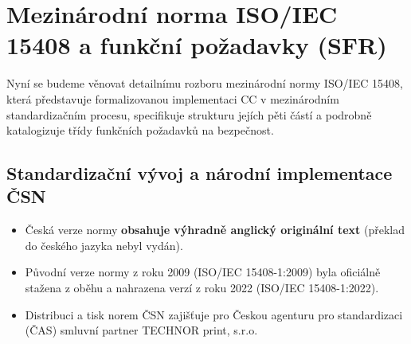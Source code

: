 \documentclass[10pt,a4paper]{article}
\begin{document}
	
	\section{Mezinárodní norma ISO/IEC 15408 a funkční požadavky (SFR)}
	
	Nyní se budeme věnovat detailnímu rozboru mezinárodní normy ISO/IEC 15408, která představuje formalizovanou implementaci CC v mezinárodním standardizačním procesu, specifikuje strukturu jejích pěti částí a podrobně katalogizuje třídy funkčních požadavků na bezpečnost.
	
	\subsection{Standardizační vývoj a národní implementace ČSN}
	
	\begin{itemize}
		\item Česká verze normy \textbf{obsahuje výhradně anglický originální text} (překlad do českého jazyka nebyl vydán).
		\item Původní verze normy z roku 2009 (ISO/IEC 15408-1:2009) byla oficiálně stažena z oběhu a nahrazena verzí z roku 2022 (ISO/IEC 15408-1:2022).
		\item Distribuci a tisk norem ČSN zajišťuje pro Českou agenturu pro standardizaci (ČAS) smluvní partner TECHNOR print, s.r.o.
	\end{itemize}
	
\end{document}
